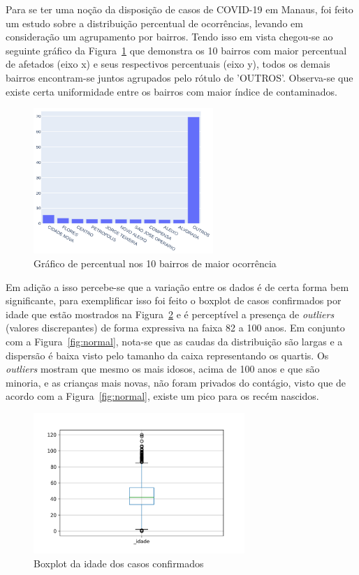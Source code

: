Para se ter uma noção da disposição de casos de COVID-19 em Manaus, foi feito um estudo sobre a distribuição percentual de ocorrências, levando em consideração um agrupamento por bairros. Tendo isso em vista chegou-se ao seguinte gráfico da Figura~\ref{fig:uc3} que demonstra os 10 bairros com maior percentual de afetados (eixo x) e seus respectivos percentuais (eixo y), todos os demais bairros encontram-se juntos agrupados pelo rótulo de 'OUTROS'. Observa-se que existe certa uniformidade entre os bairros com maior índice de contaminados.
\begin{figure}[!ht]
\centering
    \includegraphics[width=6.8cm]{img/percentualPorBairro.png}
    \caption{Gráfico de percentual nos 10 bairros de maior ocorrência}
    \label{fig:uc3} %
\end{figure}

Em adição a isso percebe-se que a variação entre os dados é de certa forma bem significante, para exemplificar isso foi feito o boxplot de casos confirmados por idade que estão mostrados na Figura~\ref{fig:uc4} e é perceptível a presença de \textit{outliers} (valores discrepantes) de forma expressiva na faixa 82 a 100 anos. Em conjunto com a Figura~\ref{fig:normal}, nota-se que as caudas da distribuição são largas e a dispersão  é baixa visto pelo tamanho da caixa representando os quartis. Os \textit{outliers} mostram que mesmo os mais idosos, acima de 100 anos e que são minoria, e as crianças mais novas, não foram privados do contágio, visto que de acordo com a Figura~\ref{fig:normal}, existe um pico para os recém nascidos.

\begin{figure}[!ht]
\centering
    \includegraphics[width=8cm]{img/boxplot.png}
    \caption{Boxplot da idade dos casos confirmados}
    \label{fig:uc4} %
\end{figure}

